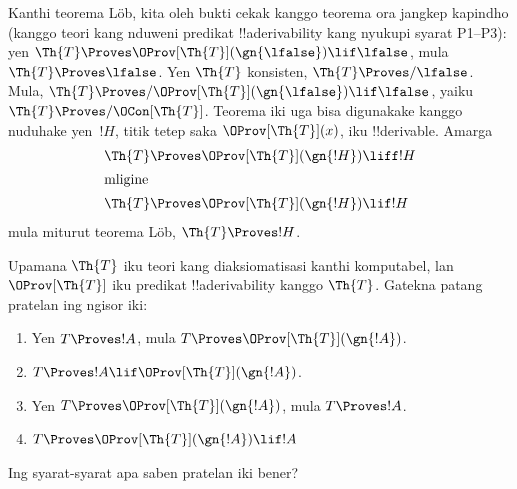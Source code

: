 \documentclass[../../../include/open-logic-section]{subfiles}
\begin{document}
Kanthi teorema L\"ob, kita oleh bukti cekak kanggo teorema ora jangkep
kapindho (kanggo teori kang nduweni predikat !!a{derivability} kang
nyukupi syarat P1--P3): yen $\Th{T} \Proves
\OProv[\Th{T}](\gn{\lfalse}) \lif \lfalse$, mula
$\Th{T} \Proves \lfalse$. Yen $\Th{T}$ konsisten,
$\Th{T} \Proves/ \lfalse$. Mula,
$\Th{T} \Proves/ \OProv[\Th{T}](\gn{\lfalse}) \lif \lfalse$,
yaiku $\Th{T} \Proves/ \OCon[\Th{T}]$. Teorema iki uga bisa
digunakake kanggo nuduhake yen~$!H$, titik tetep saka
$\OProv[\Th{T}](x)$, iku !!{derivable}. Amarga
\begin{align*}
  \Th{T} & \Proves \OProv[\Th{T}](\gn{!H}) \liff !H\\
  \intertext{mligine}
    \Th{T} & \Proves \OProv[\Th{T}](\gn{!H}) \lif !H
\end{align*}
mula miturut teorema L\"ob, $\Th{T} \Proves !H$.


\begin{prob}
Upamana $\Th{T}$ iku teori kang diaksiomatisasi kanthi komputabel,
lan $\OProv[\Th{T}]$ iku predikat !!a{derivability} kanggo
$\Th{T}$. Gatekna patang pratelan ing ngisor iki:
\begin{enumerate}
\item Yen $T \Proves !A$, mula $T \Proves \OProv[\Th{T}](\gn{!A})$.
\item $T \Proves !A \lif \OProv[\Th{T}](\gn{!A})$.
\item Yen $T \Proves \OProv[\Th{T}](\gn{!A})$, mula $T \Proves !A$.
\item $T \Proves \OProv[\Th{T}](\gn{!A}) \lif !A$
\end{enumerate}
Ing syarat-syarat apa saben pratelan iki bener?
\end{prob}
\end{document}
